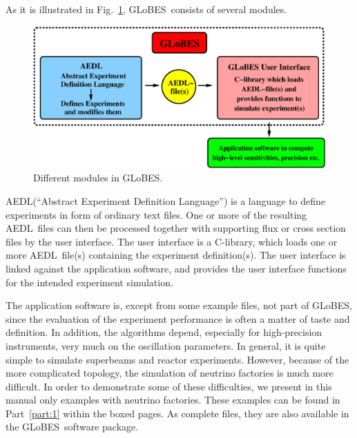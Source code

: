\documentclass[a4paper,12pt,twoside]{book}
\newcommand{\fig}{Fig.}
\newcommand{\Part}{Part}
\newcommand{\GLOBES}{{\sf GLoBES}}
\newcommand{\AEDL}{{\sf AEDL}}
\newcommand{\figu}[1]{\fig~\ref{fig:#1}}
\begin{document}
As it is illustrated in \figu{GLOBES}, \GLOBES\ consists 
of several modules.
%
\begin{figure}[bht]
\begin{center}
\includegraphics[width=16cm]{GLOBES}
\end{center}
\caption{\label{fig:GLOBES} Different modules in \GLOBES .}
\end{figure}
%
\AEDL (``Abstract Experiment Definition Language'') is a language
to define experiments in form of ordinary text files. One or more of 
the resulting \AEDL\ files can then be processed together with supporting 
flux or cross section files by the user interface. The user interface
is a C-library, which loads one or more \AEDL\ file(s)
containing the experiment definition(s). The user interface is linked 
against the application software, and provides the user interface functions
for the intended experiment simulation. 

The application 
software is, except from some example files, not part of \GLOBES , since
the evaluation of the experiment performance is often a matter of taste
and definition. In addition, the algorithms depend, especially for
high-precision instruments, very much on the oscillation parameters.
In general, it is quite simple to simulate superbeams and reactor
experiments. However, because of the more complicated topology, the
simulation of neutrino factories is much more difficult. In order
to demonstrate some of these difficulties, we present in this manual only
examples with neutrino factories. These examples can be found in
\Part~\ref{part:1} within the boxed pages. As complete files, they
are also available in the \GLOBES\ software package.
\end{document}

